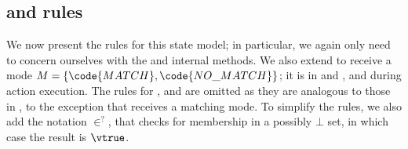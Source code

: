 \begin{mathpar}
\end{mathpar}

\subsection{ and  rules}

We now present the rules for this state model; in particular, we again only need to concern ourselves with the  and  internal methods. We also extend  to receive a mode ${M= \{\code{MATCH},\code{NO\_MATCH}\}}$; it is  in \consume{} and \produce, and  during action execution. The rules for \execac, \consume{} and \produce{} are omitted as they are analogous to those in \PMap, to the exception that  receives a matching mode. To simplify the rules, we also add the notation $\in^?$, that checks for membership in a possibly $\bot$ set, in which case the result is $\vtrue$.

